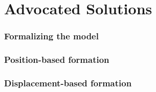 \documentclass[a4paper,12pt,oneside]{article}
\theoremstyle{definition}
\begin{document}
    
    
    \newpage

\part{Advocated Solutions}
\newpage

  \section{Formalizing the model}
    \label{sec:the_model}

    
    \newpage

  \section{Position-based formation}
    \label{sec:position_based_solution}

    
    \newpage

  \section{Displacement-based formation}
    \label{sec:displacement_based_solution}

    
    \newpage




\end{document}
